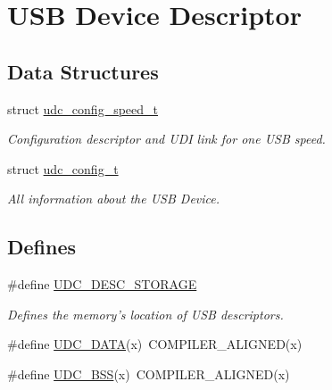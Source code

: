 \hypertarget{group__udc__desc__group}{
\section{\-U\-S\-B \-Device \-Descriptor}
\label{group__udc__desc__group}
}
\subsection*{\-Data \-Structures}
\begin{DoxyCompactItemize}
\item 
struct \hyperlink{structudc__config__speed__t}{udc\-\_\-config\-\_\-speed\-\_\-t}
\begin{DoxyCompactList}\small\item\em \-Configuration descriptor and \-U\-D\-I link for one \-U\-S\-B speed. \end{DoxyCompactList}\item 
struct \hyperlink{structudc__config__t}{udc\-\_\-config\-\_\-t}
\begin{DoxyCompactList}\small\item\em \-All information about the \-U\-S\-B \-Device. \end{DoxyCompactList}\end{DoxyCompactItemize}
\subsection*{\-Defines}
\begin{DoxyCompactItemize}
\item 
\#define \hyperlink{group__udc__desc__group_gae086959cec07a2e71ab069e25a51764f}{\-U\-D\-C\-\_\-\-D\-E\-S\-C\-\_\-\-S\-T\-O\-R\-A\-G\-E}
\begin{DoxyCompactList}\small\item\em \-Defines the memory's location of \-U\-S\-B descriptors. \end{DoxyCompactList}\item 
\#define \hyperlink{group__udc__desc__group_ga1659a2f0b429f07a985a8faaa3fb27b1}{\-U\-D\-C\-\_\-\-D\-A\-T\-A}(x)~\-C\-O\-M\-P\-I\-L\-E\-R\-\_\-\-A\-L\-I\-G\-N\-E\-D(x)
\item 
\#define \hyperlink{group__udc__desc__group_ga198e5cdf3367aa0b35821417b7ede0b2}{\-U\-D\-C\-\_\-\-B\-S\-S}(x)~\-C\-O\-M\-P\-I\-L\-E\-R\-\_\-\-A\-L\-I\-G\-N\-E\-D(x)
\end{DoxyCompactItemize}
